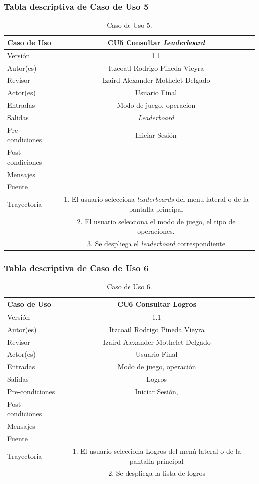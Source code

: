 \documentclass{article}
\begin{document}
\subsubsection{Tabla descriptiva de Caso de Uso 5}
\begin{table}[H]
\caption{Caso de Uso 5.}
\begin{tabular}{|M{5cm}|c|}
\hline
Caso de Uso & CU5 Consultar \emph{Leaderboard}\\ \hline
Versión & 1.1\\ \hline
Autor(es) & Itzcoatl Rodrigo Pineda Vieyra\\ \hline
Revisor & Izaird Alexander Mothelet Delgado \\ \hline
Actor(es) & Usuario Final \\ \hline
Entradas &  Modo de juego, operacion \\ \hline
Salidas & \emph{Leaderboard} \\ \hline
Pre-condiciones & Iniciar Sesión\\ \hline
Post-condiciones & \\ \hline
Mensajes & \\
Fuente &  \\ \hline	
	Trayectoria
		& 1.	El usuario selecciona \emph{leaderboards} del menu lateral o de la pantalla principal \\
		& 2. El usuario selecciona el modo de juego, el tipo de operaciones.\\
		& 3.	Se despliega el \emph{leaderboard} correspondiente\\ \hline
\end{tabular}
\end{table}

\subsubsection{Tabla descriptiva de Caso de Uso 6}
\begin{table}[H]
\caption{Caso de Uso 6.}
\begin{tabular}{|M{5cm}|c|}
\hline
Caso de Uso & CU6 Consultar Logros\\ \hline
Versión & 1.1\\ \hline
Autor(es) & Itzcoatl Rodrigo Pineda Vieyra\\ \hline
Revisor & Izaird Alexander Mothelet Delgado \\ \hline
Actor(es) & Usuario Final \\ \hline
Entradas &  Modo de juego, operación \\ \hline
Salidas & Logros \\ \hline
Pre-condiciones & Iniciar Sesión,  \\ \hline
Post-condiciones & \\ \hline
Mensajes & \\
Fuente &  \\ \hline	
	Trayectoria
		& 1. El usuario selecciona Logros del menú lateral o de la pantalla principal \\
		& 2. Se despliega la lista de logros \\ \hline
\end{tabular}
\end{table}
\end{document}
